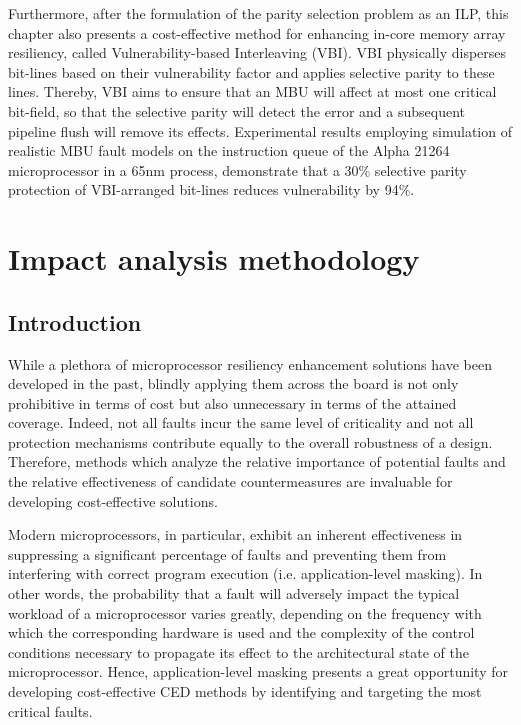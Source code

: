 \documentclass[12pt]{yalephd}
\begin{document}
Furthermore, after the formulation of the parity selection problem as an ILP, this chapter also presents a cost-effective method for enhancing in-core memory array resiliency, called Vulnerability-based Interleaving (VBI). VBI physically disperses bit-lines based on their vulnerability factor and applies selective parity to these lines. Thereby, VBI aims to ensure that an MBU will affect at most one critical bit-field, so that the selective parity will detect the error and a subsequent pipeline flush will remove its effects. Experimental results employing simulation of realistic MBU fault models on the instruction queue of the Alpha 21264 microprocessor in a 65nm process, demonstrate that a 30\% selective parity protection of VBI-arranged bit-lines reduces vulnerability by 94\%.

\chapter{Impact analysis methodology}\label{sC2}

\section{Introduction}\label{sC2Intro}

While a plethora of microprocessor resiliency enhancement solutions have been developed in the past, blindly applying them across the board is not only prohibitive in terms of cost but also unnecessary in terms of the attained coverage. Indeed, not all faults incur the same level of criticality and not all protection mechanisms contribute equally to the overall robustness of a design. Therefore, methods which analyze the relative importance of potential faults and the relative effectiveness of candidate countermeasures are invaluable for developing cost-effective solutions.

Modern microprocessors, in particular, exhibit an inherent effectiveness in suppressing a significant percentage of faults and preventing them from interfering with correct program execution (i.e. application-level masking). In other words, the probability that a fault will adversely impact the typical workload of a microprocessor varies greatly, depending on the frequency with which the corresponding hardware is used and the complexity of the control conditions necessary to propagate its effect to the architectural state of the microprocessor. Hence, application-level masking presents a great opportunity for developing cost-effective CED methods by identifying and targeting the most critical faults.
\end{document}
